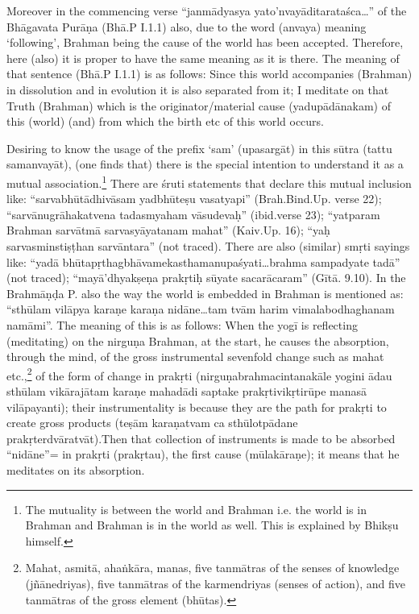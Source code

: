 Moreover in the commencing verse “janmādyasya yato’nvayāditarata\-śca…” of the Bhāgavata Purāṇa (Bhā.P I.1.1) also, due to the word (anvaya) meaning ‘following’, Brahman being the cause of the world has been accepted. Therefore, here (also) it is proper to have the same meaning as it is there. The meaning of that sentence (Bhā.P I.1.1) is as follows:  Since this world accompanies (Brahman) in dissolution and in evolution it is also separated from it; I meditate on that Truth (Brahman) which is the originator/material cause (yadupādānakam) of this (world) (and) from which the birth etc of this world occurs.   

Desiring to know the usage of the prefix ‘sam’ (upasargāt) in this sūtra  (tattu samanvayāt), (one finds that) there is the special intention to understand it as a mutual association.\footnote{The mutuality is between the world and Brahman i.e. the world is in Brahman and Brahman is in the world as well. This is explained by Bhikṣu himself.} There are śruti statements that declare this mutual inclusion like: “sarvabhūtādhivāsam yad\break bhūteṣu vasatyapi” (Brah.Bind.Up. verse 22); “sarvānugrāhakatvena tadasmyaham vāsudevaḥ” (ibid.verse 23); “yatparam Brahman sarvā\-tmā sarvasyāyatanam mahat” (Kaiv.Up. 16); “yaḥ sarvasminstiṣṭhan sarvāntara” (not traced). There are also (similar) smṛti sayings like: “yadā bhūtapṛthagbhāvamekasthamanupaśyati…brahma sampadyate tadā” (not traced); “mayā’dhyakṣeṇa prakṛtiḥ sūyate sacarācaram” (Gītā. 9.10). In the Brahmāṇḍa P. also the way the world is embedded in Brahman is mentioned as: “sthūlam vilāpya karaṇe karaṇa nidāne…tam tvām harim vimalabodhaghanam namāmi”. The meaning of this is as follows: When the yogī is reflecting (meditating) on the nirguṇa Brahman, at the start, he causes the absorption, through the mind, of the gross instrumental sevenfold change such as mahat etc.,\footnote{Mahat, asmitā, ahaṅkāra, manas, five tanmātras of the senses of knowledge (jñānedriyas), five tanmātras of the karmendriyas (senses of action), and five tanmātras of the gross element (bhūtas).} of the form of change in prakṛti (nirguṇabrahmacintanakāle yogini ādau sthūlam vikārajātam karaṇe mahadādi  saptake prakṛtivikṛtirūpe manasā vilāpayanti); their instrumentality is because they are the path for prakṛti to create gross products (teṣām karaṇatvam ca sthūlotpādane prakṛterdvāratvāt).Then that collection of instruments is made to be absorbed “nidāne”= in prakṛti (prakṛtau), the first cause (mūlakāraṇe); it means that he meditates on its absorption. 

